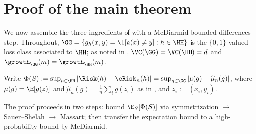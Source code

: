 \section{Proof of the main theorem}\label{sec:proof-of-main}

We now assemble the three ingredients of  with a McDiarmid bounded-differences step. Throughout, $\GG = \{g_h(x,y) = \1[h(x) \ne y] : h \in \HH\}$ is the $\{0,1\}$-valued loss class associated to $\HH$; as noted in , $\VC(\GG) = \VC(\HH) = d$ and $\growth_{\GG}(m) = \growth_{\HH}(m)$.

Write $\Phi(S) := \sup_{h \in \HH} |\Risk(h) - \eRisk_n(h)| = \sup_{g \in \GG} | \mu(g) - \widehat{\mu}_n(g) |$, where $\mu(g) = \E[g(z)]$ and $\widehat{\mu}_n(g) = \tfrac{1}{n}\sum_i g(z_i)$ as in , and $z_i := (x_i, y_i)$.

The proof proceeds in two steps: bound $\E_S[\Phi(S)]$ via symmetrization $\to$ Sauer--Shelah $\to$ Massart; then transfer the expectation bound to a high-probability bound by McDiarmid.

